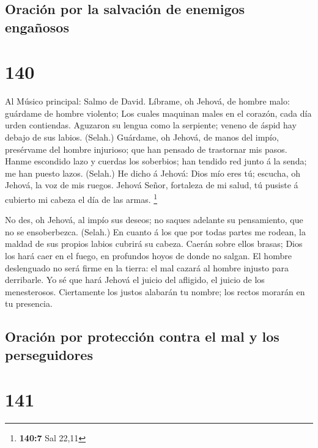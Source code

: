 \hypertarget{oraciuxf3n-por-la-salvaciuxf3n-de-enemigos-engauxf1osos}{%
\subsection{Oración por la salvación de enemigos
engañosos}\label{oraciuxf3n-por-la-salvaciuxf3n-de-enemigos-engauxf1osos}}

\hypertarget{section-139}{%
\section{140}\label{section-139}}

 Al Músico principal: Salmo de David. Líbrame, oh Jehová, de
hombre malo: guárdame de hombre violento;  Los cuales
maquinan males en el corazón, cada día urden contiendas. 
Aguzaron su lengua como la serpiente; veneno de áspid hay debajo de sus
labios. (Selah.)  Guárdame, oh Jehová, de manos del impío,
presérvame del hombre injurioso; que han pensado de trastornar mis
pasos.  Hanme escondido lazo y cuerdas los soberbios; han
tendido red junto á la senda; me han puesto lazos. (Selah.) 
He dicho á Jehová: Dios mío eres tú; escucha, oh Jehová, la voz de mis
ruegos.  Jehová Señor, fortaleza de mi salud, tú pusiste á
cubierto mi cabeza el día de las armas. \footnote{\textbf{140:7} Sal
  22,11}

 No des, oh Jehová, al impío sus deseos; no saques adelante
su pensamiento, que no se ensoberbezca. (Selah.)  En cuanto
á los que por todas partes me rodean, la maldad de sus propios labios
cubrirá su cabeza.  Caerán sobre ellos brasas; Dios los
hará caer en el fuego, en profundos hoyos de donde no salgan.
 El hombre deslenguado no será firme en la tierra: el mal
cazará al hombre injusto para derribarle.  Yo sé que hará
Jehová el juicio del afligido, el juicio de los menesterosos.
 Ciertamente los justos alabarán tu nombre; los rectos
morarán en tu presencia.

\hypertarget{oraciuxf3n-por-protecciuxf3n-contra-el-mal-y-los-perseguidores}{%
\subsection{Oración por protección contra el mal y los
perseguidores}\label{oraciuxf3n-por-protecciuxf3n-contra-el-mal-y-los-perseguidores}}

\hypertarget{section-140}{%
\section{141}\label{section-140}}

